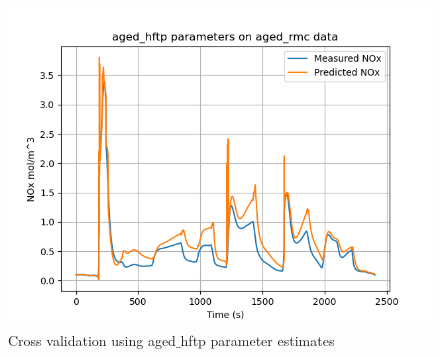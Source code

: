 \begin{figure}[H]
\begin{minipage}{0.3\textwidth}
                \includegraphics[width = \textwidth]{./figs/figs_new_mdl/aged_hftp_aged_rmc.png}
        \end{minipage}
        \caption{Cross validation using aged$\_$hftp parameter estimates}
\end{figure}

